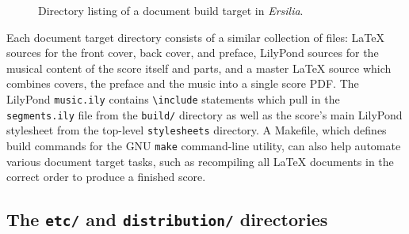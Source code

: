 \begin{figure}[h!]
\begin{singlespacing}
\vspace{-0.5\baselineskip}
\end{singlespacing}
\caption{Directory listing of a document build target in \emph{Ersilia}.}
\end{figure}

Each document target directory consists of a similar collection of files: LaTeX
sources for the front cover, back cover, and preface, LilyPond sources for the
musical content of the score itself and parts, and a master LaTeX source which
combines covers, the preface and the music into a single score PDF. The
LilyPond \texttt{music.ily} contains \texttt{\textbackslash{}include}
statements which pull in the \texttt{segments.ily} file from the
\texttt{build/} directory as well as the score's main LilyPond stylesheet from
the top-level \texttt{stylesheets} directory. A Makefile, which defines build
commands for the GNU \texttt{make} command-line utility, can also help automate
various document target tasks, such as recompiling all LaTeX documents in the
correct order to produce a finished score.

\subsection{The \texttt{etc/} and \texttt{distribution/} directories}
\label{ssec:the-etc-and-distribution-directories}

